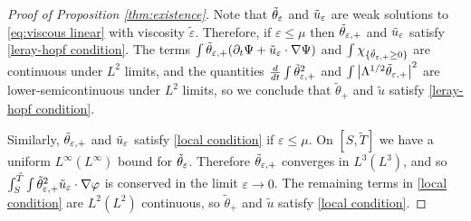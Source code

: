 \documentclass[11pt]{amsart}
\theoremstyle{remark}
\theoremstyle{definition}
\newcommand{\eps}{\varepsilon}
\newcommand{\abs}[1]{\left\lvert #1 \right\rvert}
\newcommand{\del}{\partial}
\newcommand{\grad}{\nabla}
\newcommand{\ddt}{\frac{d}{dt}}
\newcommand{\indic}[1]{\chi_{\{#1\}}}
\begin{document}
\begin{proof}[Proof of Proposition \ref{thm:existence}]
Note that $\thetae$ and $\ue$ are weak solutions to \eqref{eq:viscous linear} with viscosity $\tilde{\eps}$.  Therefore, if $\eps \leq \mu$ then $\thetaep$ and $\ue$ satisfy \eqref{leray-hopf condition}.  The terms $\int \thetaep (\del_t\Psi+\ue\cdot\grad\Psi)$ and $\int \indic{\thetaep\geq 0}$ are continuous under $L^2$ limits, and the quantities $\ddt \int \thetaep^2$ and $\int \abs{\Lambda^{1/2} \thetaep}^2$ are lower-semicontinuous under $L^2$ limits, so we conclude that $\tilde{\theta}_+$ and $\tilde{u}$ satisfy \eqref{leray-hopf condition}.  

Similarly, $\thetaep$ and $\ue$ satisfy \eqref{local condition} if $\eps \leq \mu$.  On $[S, \tilde{T}]$ we have a uniform $L^\infty(L^\infty)$ bound for $\thetae$. Therefore $\thetaep$ converges in $L^3(L^3)$, and so $\int_S^{\tilde{T}}\int \thetaep^2 \ue\cdot\grad\varphi$ is conserved in the limit $\eps \to 0$.  The remaining terms in \eqref{local condition} are $L^2(L^2)$ continuous, so $\tilde{\theta}_+$ and $\tilde{u}$ satisfy \eqref{local condition}.  
\end{proof}
\end{document}
